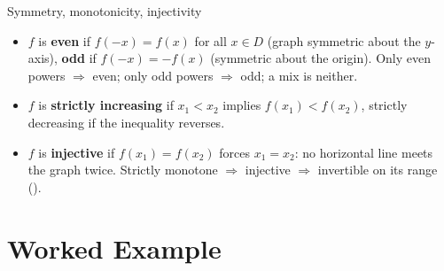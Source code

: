\begin{rulebox}{Symmetry, monotonicity, injectivity}
\begin{itemize}[leftmargin=1.6em,itemsep=0.3ex]
  \item $f$ is \textbf{even}  if $f(-x)=f(x)$ for all $x\in D$
        (graph symmetric about the $y$-axis), \textbf{odd}
         if $f(-x)=-f(x)$ (symmetric about the origin).
        Only even powers $\Rightarrow$ even; only odd powers
        $\Rightarrow$ odd; a mix is neither.
  \item $f$ is \textbf{strictly increasing} if $x_{1}<x_{2}$ implies
        $f(x_{1})<f(x_{2})$, strictly decreasing if the inequality
        reverses.
  \item $f$ is \textbf{injective}  if $f(x_{1})=f(x_{2})$
        forces $x_{1}=x_{2}$: no horizontal line meets the graph twice.
        Strictly monotone $\Rightarrow$ injective $\Rightarrow$ invertible
        on its range ().
\end{itemize}
\end{rulebox}

\section{Worked Example}

